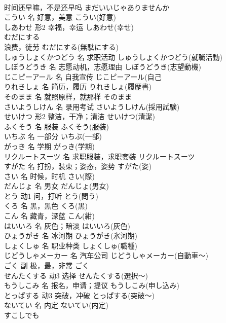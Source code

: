 \documentclass[8pt]{extreport}
\begin{document}
\begin{CJK}{UTF8}{min}
\\	时间还早嘛，不是还早吗	まだいいじゃありませんか	
\\	こうい	名	好意，美意	こうい(好意)	
\\	しあわせ	形2	幸福，幸运	しあわせ(幸せ)	
\\	むだにする	
\\	浪费，徒劳	むだにする(無駄にする)	
\\	しゅうしょくかつどう	名	求职活动	しゅうしょくかつどう(就職活動)	
\\	しぼうどうき	名	志愿动机，志愿理由	しぼうどうき(志望動機)	
\\	じこピーアール	名	自我宣传	じこピーアール(自己
\\	りれきしょ	名	简历，履历	りれきしょ(履歴書)	
\\	そのまま	名	就照原样，就那样	そのまま	
\\	さいようしけん	名	录用考试	さいようしけん(採用試験)	
\\	せいけつ	形2	整洁，干净；清洁	せいけつ(清潔)	
\\	ふくそう	名	服装	ふくそう(服装)	
\\	いちぶ	名	一部分	いちぶ(一部)	
\\	がっき	名	学期	がっき(学期)	
\\	リクルートスーツ	名	求职服装，求职套装	リクルートスーツ	
\\	すがた	名	打扮，装束；姿态，姿势	すがた(姿)	
\\	さい	名	时候，时机	さい(際)	
\\	だんじょ	名	男女	だんじょ(男女)	
\\	とう	动1	问，打听	とう(問う)	
\\	くろ	名	黑，黑色	くろ(黒)	
\\	こん	名	藏青，深蓝	こん(紺)	
\\	はいいろ	名	灰色；暗淡	はいいろ(灰色)	
\\	ひょうがき	名	冰河期	ひょうがき(氷河期)	
\\	しょくしゅ	名	职业种类	しょくしゅ(職種)	
\\	じどうしゃメーカー	名	汽车公司	じどうしゃメーカー(自動車～)	
\\	ごく	副	极，最，非常	ごく	
\\	せんたくする	动3	选择	せんたくする(選択～)	
\\	もうしこみ	名	报名，申请；提议	もうしこみ(申し込み)	
\\	とっぱする	动3	突破，冲破	とっぱする(突破～)	
\\	ないてい	名	内定	ないてい(内定)	
\\	すこしでも	

\end{CJK}
\end{document}
